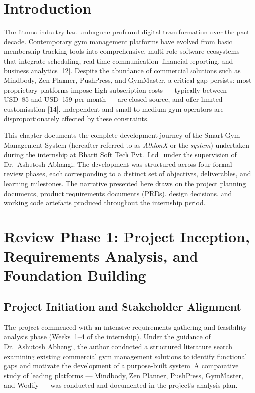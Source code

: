 \documentclass[
  12pt,
  a4paperpaper,
]{report}
\begin{document}

\section{Introduction}\label{introduction-1}

The fitness industry has undergone profound digital transformation over
the past decade. Contemporary gym management platforms have evolved from
basic membership-tracking tools into comprehensive, multi-role software
ecosystems that integrate scheduling, real-time communication,
financial reporting, and business analytics {[}12{]}. Despite
the abundance of commercial solutions such as Mindbody, Zen Planner,
PushPress, and GymMaster, a critical gap persists: most proprietary
platforms impose high subscription costs --- typically between USD~85
and USD~159 per month --- are closed-source, and offer limited
customisation {[}14{]}. Independent and small-to-medium
gym operators are disproportionately affected by these constraints.

This chapter documents the complete development journey of the Smart
Gym Management System (hereafter referred to as \emph{AthlonX} or
the \emph{system}) undertaken during the internship at Bharti Soft
Tech Pvt.~Ltd.~under the supervision of Dr.~Ashutosh Abhangi. The
development was structured across four formal review phases, each
corresponding to a distinct set of objectives, deliverables, and
learning milestones. The narrative presented here draws on the
project planning documents, product requirements documents (PRDs),
design decisions, and working code artefacts produced throughout the
internship period.


\section{Review Phase 1: Project Inception, Requirements Analysis, and
Foundation Building}\label{review-phase-1}

\subsection{Project Initiation and Stakeholder
Alignment}\label{project-initiation}

The project commenced with an intensive requirements-gathering and
feasibility analysis phase (Weeks~1--4 of the internship). Under the
guidance of Dr.~Ashutosh Abhangi, the author conducted a structured
literature search examining existing commercial gym management
solutions to identify functional gaps and motivate the development of
a purpose-built system. A comparative study of leading platforms ---
Mindbody, Zen Planner, PushPress, GymMaster, and Wodify --- was
conducted and documented in the project's analysis plan.
\end{document}
